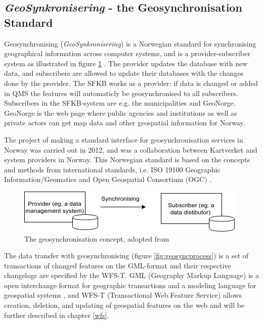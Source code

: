 


\subsection{\textit{GeoSynkronisering} - the Geosynchronisation Standard}\label{geosync}

Geosynchronising (\textit{GeoSynkronisering}) is a Norwegian standard for synchronising geographical information across computer systems, and is a provider-subscriber system as illustrated in figure \ref{fig:geosync} \citep{Kartverket2013}. The provider updates the database with new data, and subscribers are allowed to update their databases with the changes done by the provider. The SFKB works as a provider: if data is changed or added in QMS the features will automaticly be geosynchronised to all subscribers. Subscribers in the SFKB-system are e.g. the municipalities and GeoNorge. GeoNorge is the web page where public agencies and institutions as well as private actors can get map data and other geospatial information for Norway.  

The project of making a standard interface for geosynchronisation services in Norway was carried out in 2012, and was a collaboration between Kartverket and system providers in Norway. This Norwegian standard is based on the concepts and methods from international standards, i.e. ISO 19100 Geographic Information/Geomatics and Open Geospatial Consortium (OGC) \citep{Kartverket2013}.

 
\begin{figure}[H]
	\centering
	\includegraphics[scale=0.5]{img/geosync.png}
	\caption{The geosynchronisation concept, adopted from \cite[p.~16]{Kartverket2013} }
	\label{fig:geosync}
\end{figure}


The data transfer with geosynchronising (figure \ref{fig:geosyncprocess}) is a set of transactions of changed features on the GML-format and their respective changelogs are specified by the WFS-T.  GML (Geography Markup Language) is a open interchange format for geographic transactions and a modeling language for geospatial systems \citep{OGC2017}, and WFS-T (Transactional Web Feature Service) allows creation, deletion, and updating of geospatial features on the web \citep{OGCNetwork} and will be further described in chapter \ref{wfs}. 

